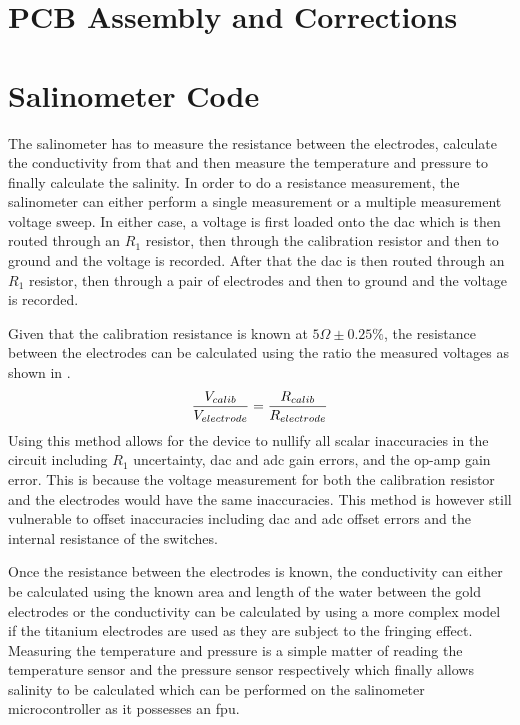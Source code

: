 \section{PCB Assembly and Corrections}

\section{Salinometer Code}

The salinometer has to measure the resistance between the electrodes, calculate the conductivity from that and then measure the temperature and pressure to finally calculate the salinity.
In order to do a resistance measurement, the salinometer can either perform a single measurement or a multiple measurement voltage sweep.
In either case, a voltage is first loaded onto the \gls{dac} which is then routed through an $R_1$ resistor, then through the calibration resistor and then to ground and the voltage is recorded.
After that the \gls{dac} is then routed through an $R_1$ resistor, then through a pair of electrodes and then to ground and the voltage is recorded.

Given that the calibration resistance is known at $5\Omega\pm0.25\%$, the resistance between the electrodes can be calculated using the ratio the measured voltages as shown in .
\begin{equation}
    \frac{\displaystyle V_{calib}}{\displaystyle V_{electrode}} = \frac{\displaystyle R_{calib}}{\displaystyle R_{electrode}}
    \label{eqn:electrode-calib-resistance}
\end{equation}
Using this method allows for the device to nullify all scalar inaccuracies in the circuit including $R_1$ uncertainty, \gls{dac} and \gls{adc} gain errors, and the op-amp gain error.
This is because the voltage measurement for both the calibration resistor and the electrodes would have the same inaccuracies. 
This method is however still vulnerable to offset inaccuracies including \gls{dac} and \gls{adc} offset errors and the internal resistance of the switches.

Once the resistance between the electrodes is known, the conductivity can either be calculated using the known area and length of the water between the gold electrodes or the conductivity can be calculated by using a more complex model if the titanium electrodes are used as they are subject to the fringing effect.
Measuring the temperature and pressure is a simple matter of reading the temperature sensor and the pressure sensor respectively which finally allows salinity to be calculated which can be performed on the salinometer microcontroller as it possesses an \gls{fpu}.

